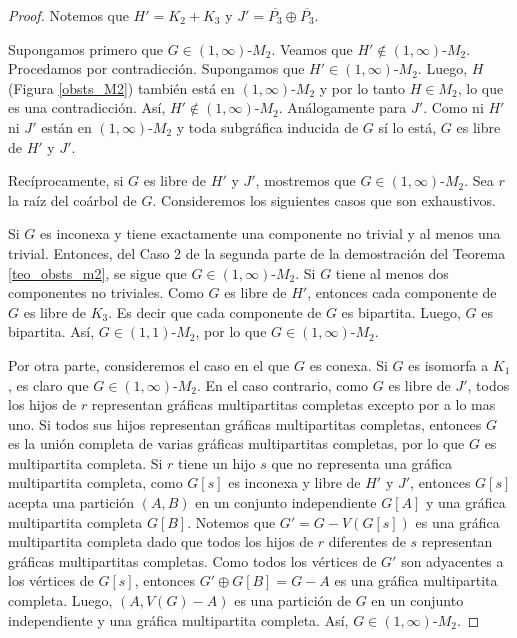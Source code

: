 \begin{proof}

Notemos que $H'=K_2 + K_3$ y $J'=\overline{P_3} \oplus \overline{P_3}$.

Supongamos primero que $G \in (1,\infty)$-$M_2$. Veamos que $H'\notin (1,\infty)$-$M_2$. Procedamos por contradicción. Supongamos que $H' \in (1,\infty)$-$M_2$. Luego, $H$ (Figura \ref{obsts_M2}) también está en $(1,\infty)$-$M_2$ y por lo tanto $H\in M_2$, lo que es una contradicción. Así,  $H'\notin (1,\infty)$-$M_2$. Análogamente para $J'$. Como ni $H'$ ni $J'$ están en $(1,\infty)$-$M_2$ y toda subgráfica inducida de $G$ sí lo está, $G$ es libre de $H'$ y $J'$.

Recíprocamente, si $G$ es libre de $H'$ y $J'$, mostremos que $G\in (1,\infty)$-$M_2$. Sea $r$ la raíz del coárbol de $G$. Consideremos los siguientes casos que son exhaustivos.

Si $G$ es inconexa y tiene exactamente una componente no trivial y al menos una trivial. Entonces, del Caso 2 de la segunda parte de la demostración del Teorema \ref{teo_obsts_m2}, se sigue que $G \in (1,\infty)$-$M_2$. Si $G$ tiene al menos dos componentes no triviales. Como $G$ es libre de $H'$, entonces cada componente de $G$ es libre de $K_3$. Es decir que cada componente de $G$ es bipartita. Luego, $G$ es bipartita. Así, $G \in (1,1)$-$M_2$, por lo que $G \in (1,\infty)$-$M_2$.

Por otra parte, consideremos el caso en el que $G$ es conexa.  Si $G$ es isomorfa a $K_1$, es claro que $G \in (1,\infty)$-$M_2$. En el caso contrario, como $G$ es libre de $J'$, todos los hijos de $r$ representan gráficas multipartitas completas excepto por a lo mas uno. Si todos sus hijos representan gráficas multipartitas completas, entonces $G$ es la unión completa de varias gráficas multipartitas completas, por lo que $G$ es multipartita completa. Si $r$ tiene un hijo $s$ que no representa una gráfica multipartita completa, como $G[s]$ es inconexa y libre de $H'$ y $J'$, entonces $G[s]$ acepta una partición $(A,B)$ en un conjunto independiente $G[A]$ y una gráfica multipartita completa $G[B]$. Notemos que $G' = G-V(G[s])$ es una gráfica multipartita completa dado que todos los hijos de $r$ diferentes de $s$ representan gráficas multipartitas completas. Como todos los vértices de $G'$ son adyacentes a los vértices de $G[s]$, entonces $G'\oplus G[B]=G-A$ es una gráfica multipartita completa. Luego, $(A,V(G)-A)$ es una partición de $G$ en un conjunto independiente y una gráfica multipartita completa. Así, $G \in (1,\infty)$-$M_2$.

\end{proof}
